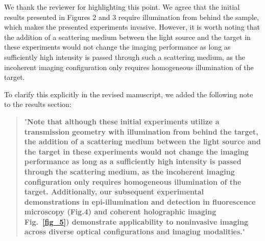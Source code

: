 \documentclass[12pt]{article}
\newenvironment{finished_ourresponse}
    {\begin{tcolorbox}[width=\linewidth,breakable,enhanced,colback=gray!5,colframe=finished_responsecolor!50,title=Response,left=5pt,right=5pt]}
    {\end{tcolorbox}}
\begin{document}
\begin{finished_ourresponse}
    We thank the reviewer for highlighting this point.
    We agree that the initial results presented in Figures 2 and 3 require illumination from behind the sample, which makes the presented experiments invasive. However, it is worth noting that the addition of a scattering medium between the light source and the target in these experiments would not change the imaging performance as long as sufficiently high intensity is passed through such a scattering medium, as the incoherent imaging configuration only requires homogeneous illumination of the target.
    
    To clarify this explicitly in the revised manuscript, we added the following note to the results section:
    \begin{quote}
        "{\bfseries Note that although these initial experiments utilize a transmission geometry with illumination from behind the target, the addition of a scattering medium between the light source and the target in these experiments would not change the imaging performance as long as a sufficiently high intensity is passed through the scattering medium, as the incoherent imaging configuration only requires homogeneous illumination of the target. Additionally, our subsequent experimental demonstrations in epi-illumination and detection in fluorescence microscopy (Fig.4) and coherent holographic imaging Fig.~\ref{fig_5}) demonstrate applicability to noninvasive imaging across diverse optical configurations and imaging modalities.}"
    \end{quote}

\end{finished_ourresponse}
\end{document}
